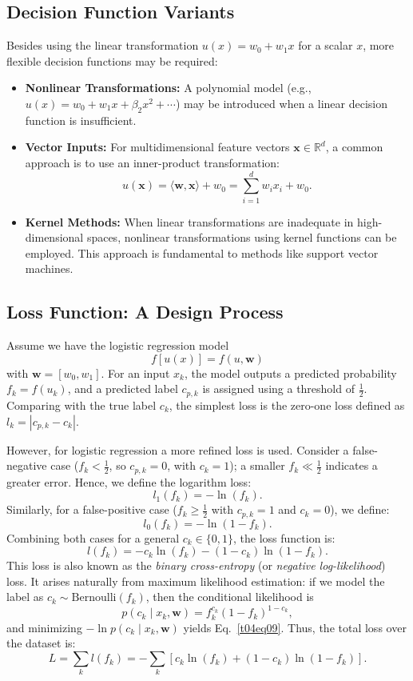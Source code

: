 \documentclass[12pt]{article}
\begin{document}
\subsection{Decision Function Variants}
Besides using the linear transformation $u(x) = w_0 + w_1 x$ for a scalar $x$, more flexible decision functions may be required:
\begin{itemize}
    \item \textbf{Nonlinear Transformations:} A polynomial model (e.g., $u(x) = w_0 + w_1 x + \beta_2 x^2 + \cdots$) may be introduced when a linear decision function is insufficient.
    \item \textbf{Vector Inputs:} For multidimensional feature vectors $\bm{x} \in \mathbb{R}^d$, a common approach is to use an inner-product transformation:
    \begin{equation}
    u(\bm{x}) = \langle \bm{w}, \bm{x} \rangle + w_0 = \sum_{i=1}^{d} w_i x_i + w_0.
    \label{t04eq08}
    \end{equation}
    \item \textbf{Kernel Methods:} When linear transformations are inadequate in high-dimensional spaces, nonlinear transformations using kernel functions can be employed. This approach is fundamental to methods like support vector machines.
\end{itemize}

\subsection{Loss Function: A Design Process}
Assume we have the logistic regression model 
\[
f[u(x)] = f(u,\bm{w})
\]
with $\bm{w} = [w_0, w_1]$. For an input $x_k$, the model outputs a predicted probability $f_k=f(u_k)$, and a predicted label $c_{p,k}$ is assigned using a threshold of $\frac{1}{2}$. Comparing with the true label $c_k$, the simplest loss is the zero-one loss defined as $l_k = |c_{p,k} - c_k|$. 

However, for logistic regression a more refined loss is used. Consider a false-negative case ($f_k < \frac{1}{2}$, so $c_{p,k}=0$, with $c_k=1$); a smaller $f_k \ll \frac{1}{2}$ indicates a greater error. Hence, we define the logarithm loss:
\[
l_1(f_k) = -\ln(f_k).
\]
Similarly, for a false-positive case ($f_k \ge \frac{1}{2}$ with $c_{p,k}=1$ and $c_k=0$), we define:
\[
l_0(f_k) = -\ln(1-f_k).
\]
Combining both cases for a general $c_k \in \{0,1\}$, the loss function is:
\begin{equation}
    l(f_k) = -c_k \ln(f_k) - (1-c_k) \ln(1-f_k).
    \label{t04eq09}
\end{equation}
This loss is also known as the \emph{binary cross-entropy} (or \emph{negative log-likelihood}) loss. It arises naturally from maximum likelihood estimation: if we model the label as $c_k\sim\mathrm{Bernoulli}(f_k)$, then the conditional likelihood is
 \[
p(c_k \mid x_k, \bm{w}) = f_k^{c_k}(1-f_k)^{1-c_k},
 \]
and minimizing $-\ln p(c_k \mid x_k, \bm{w})$ yields Eq.~\eqref{t04eq09}.
Thus, the total loss over the dataset is:
\begin{equation}
    L = \sum_k l(f_k) = -\sum_k \left[ c_k \ln(f_k) + (1-c_k) \ln(1-f_k) \right].
    \label{t04eq11}
\end{equation}
\end{document}
